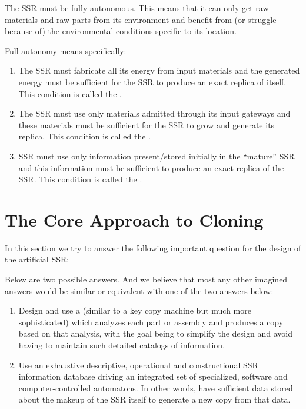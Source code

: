 The SSR must be fully autonomous. This means that it can only get raw
materials and raw parts from its environment and benefit from (or
struggle because of) the environmental conditions specific to its
location.

Full autonomy means specifically\citep{freitasmerkle2004}:

\begin{enumerate}
\item The SSR must fabricate all its energy from input materials and the
generated energy must be sufficient for the SSR to produce an exact
replica of itself. This condition is called the . 
\item The SSR must use only materials admitted through its input gateways
and these materials must be sufficient for the SSR to grow and generate
its replica. This condition is called the . 
\item SSR must use only information present/stored initially in the
“mature” SSR and this information must be sufficient to produce an
exact replica of the SSR. This condition is called the
.
\end{enumerate}

\section{The Core Approach to Cloning}

In this section we try to answer the following important question for
the design of the artificial SSR: 

Below are two possible answers. And we believe that most any other
imagined answers would be similar or equivalent with one of the
two answers below:

\begin{enumerate}
\item Design and use a  (similar to a key copy
machine but much more sophisticated) which analyzes each part or assembly and produces
a copy based on that analysis, with the goal being to simplify the design and
avoid having to maintain such detailed catalogs of information.
\item Use an exhaustive descriptive, operational and constructional SSR
information database driving an integrated set of specialized, software
and computer-controlled automatons.  In other words, have sufficient
data stored about the makeup of the SSR itself to generate a new copy
from that data.
\end{enumerate}

